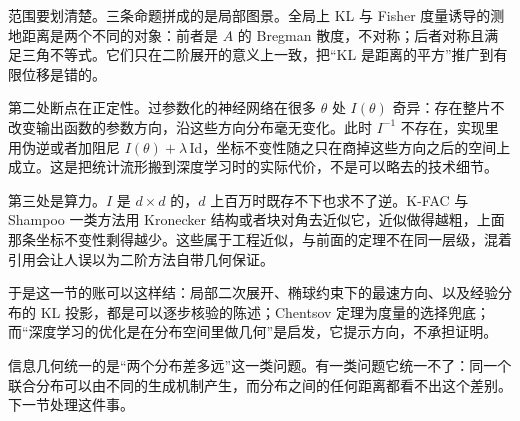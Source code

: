 范围要划清楚。三条命题拼成的是局部图景。全局上 KL 与 Fisher 度量诱导的测地距离是两个不同的对象：前者是 \(A\) 的 Bregman 散度，不对称；后者对称且满足三角不等式。它们只在二阶展开的意义上一致，把``KL 是距离的平方''推广到有限位移是错的。

第二处断点在正定性。过参数化的神经网络在很多 \(\theta\) 处 \(I(\theta)\) 奇异：存在整片不改变输出函数的参数方向，沿这些方向分布毫无变化。此时 \(I^{-1}\) 不存在，实现里用伪逆或者加阻尼 \(I(\theta)+\lambda\,\mathrm{Id}\)，坐标不变性随之只在商掉这些方向之后的空间上成立。这是把统计流形搬到深度学习时的实际代价，不是可以略去的技术细节。

第三处是算力。\(I\) 是 \(d\times d\) 的，\(d\) 上百万时既存不下也求不了逆。K-FAC 与 Shampoo 一类方法用 Kronecker 结构或者块对角去近似它，近似做得越粗，上面那条坐标不变性剩得越少。这些属于工程近似，与前面的定理不在同一层级，混着引用会让人误以为二阶方法自带几何保证。

于是这一节的账可以这样结：局部二次展开、椭球约束下的最速方向、以及经验分布的 KL 投影，都是可以逐步核验的陈述；Chentsov 定理为度量的选择兜底；而``深度学习的优化是在分布空间里做几何''是启发，它提示方向，不承担证明。

信息几何统一的是``两个分布差多远''这一类问题。有一类问题它统一不了：同一个联合分布可以由不同的生成机制产生，而分布之间的任何距离都看不出这个差别。下一节处理这件事。
